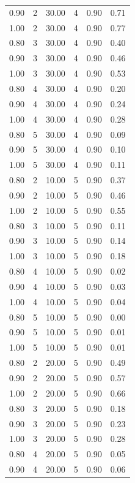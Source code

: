 \documentclass[12pt]{article}
\begin{document}
{\begin{longtable}{cccccc}
  0.90 &   2 & 30.00 &   4 & 0.90 & 0.71 \\ 
  1.00 &   2 & 30.00 &   4 & 0.90 & 0.77 \\ 
  0.80 &   3 & 30.00 &   4 & 0.90 & 0.40 \\ 
  0.90 &   3 & 30.00 &   4 & 0.90 & 0.46 \\ 
  1.00 &   3 & 30.00 &   4 & 0.90 & 0.53 \\ 
  0.80 &   4 & 30.00 &   4 & 0.90 & 0.20 \\ 
  0.90 &   4 & 30.00 &   4 & 0.90 & 0.24 \\ 
  1.00 &   4 & 30.00 &   4 & 0.90 & 0.28 \\ 
  0.80 &   5 & 30.00 &   4 & 0.90 & 0.09 \\ 
  0.90 &   5 & 30.00 &   4 & 0.90 & 0.10 \\ 
  1.00 &   5 & 30.00 &   4 & 0.90 & 0.11 \\ 
  0.80 &   2 & 10.00 &   5 & 0.90 & 0.37 \\ 
  0.90 &   2 & 10.00 &   5 & 0.90 & 0.46 \\ 
  1.00 &   2 & 10.00 &   5 & 0.90 & 0.55 \\ 
  0.80 &   3 & 10.00 &   5 & 0.90 & 0.11 \\ 
  0.90 &   3 & 10.00 &   5 & 0.90 & 0.14 \\ 
  1.00 &   3 & 10.00 &   5 & 0.90 & 0.18 \\ 
  0.80 &   4 & 10.00 &   5 & 0.90 & 0.02 \\ 
  0.90 &   4 & 10.00 &   5 & 0.90 & 0.03 \\ 
  1.00 &   4 & 10.00 &   5 & 0.90 & 0.04 \\ 
  0.80 &   5 & 10.00 &   5 & 0.90 & 0.00 \\ 
  0.90 &   5 & 10.00 &   5 & 0.90 & 0.01 \\ 
  1.00 &   5 & 10.00 &   5 & 0.90 & 0.01 \\ 
  0.80 &   2 & 20.00 &   5 & 0.90 & 0.49 \\ 
  0.90 &   2 & 20.00 &   5 & 0.90 & 0.57 \\ 
  1.00 &   2 & 20.00 &   5 & 0.90 & 0.66 \\ 
  0.80 &   3 & 20.00 &   5 & 0.90 & 0.18 \\ 
  0.90 &   3 & 20.00 &   5 & 0.90 & 0.23 \\ 
  1.00 &   3 & 20.00 &   5 & 0.90 & 0.28 \\ 
  0.80 &   4 & 20.00 &   5 & 0.90 & 0.05 \\ 
  0.90 &   4 & 20.00 &   5 & 0.90 & 0.06 \\ 

\end{longtable}}
\end{document}
